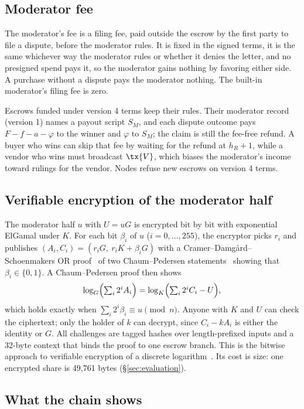 \subsection{Moderator fee}
\label{sec:modfee}
The moderator's fee is a filing fee, paid outside the escrow by the first party to file a dispute, before the moderator rules. It is fixed in the signed terms, it is the same whichever way the moderator rules or whether it denies the letter, and no presigned spend pays it, so the moderator gains nothing by favoring either side. A purchase without a dispute pays the moderator nothing. The built-in moderator's filing fee is zero.

Escrows funded under version 4 terms keep their rules. Their moderator record (version 1) names a payout script $S_M$, and each dispute outcome pays $F-f-a-\varphi$ to the winner and $\varphi$ to $S_M$; the claim is still the fee-free refund. A buyer who wins can skip that fee by waiting for the refund at $h_R+1$, while a vendor who wins must broadcast $\tx{V}$, which biases the moderator's income toward rulings for the vendor. Nodes refuse new escrows on version 4 terms.

\subsection{Verifiable encryption of the moderator half}
\label{sec:vencrypt}

The moderator half $u$ with $U=uG$ is encrypted bit by bit with exponential ElGamal under $K$. For each bit $\beta_i$ of $u$ ($i=0,\dots,255$), the encryptor picks $r_i$ and publishes $(A_i,C_i)=(r_iG,\ r_iK+\beta_iG)$ with a Cramer--Damg{\aa}rd--Schoenmakers OR proof~\citep{cramer1994} of two Chaum--Pedersen statements~\citep{chaum1992} showing that $\beta_i\in\{0,1\}$. A Chaum--Pedersen proof then shows
\[
  \log_G\Bigl(\textstyle\sum_i 2^iA_i\Bigr)=\log_K\Bigl(\textstyle\sum_i 2^iC_i-U\Bigr),
\]
which holds exactly when $\sum_i 2^i\beta_i\equiv u \pmod n$. Anyone with $K$ and $U$ can check the ciphertext; only the holder of $k$ can decrypt, since $C_i-kA_i$ is either the identity or $G$. All challenges are tagged hashes over length-prefixed inputs and a 32-byte context that binds the proof to one escrow branch. This is the bitwise approach to verifiable encryption of a discrete logarithm~\citep{stadler1996pvss,camenisch2003}. Its cost is size: one encrypted share is 49{,}761 bytes (\S\ref{sec:evaluation}).

\subsection{What the chain shows}
\label{sec:escrow-privacy}

